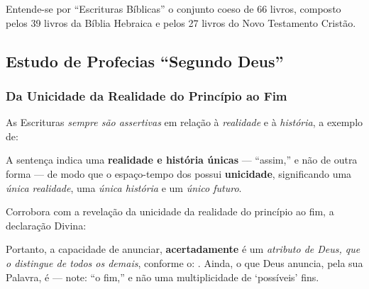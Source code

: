     Entende-se por ``Escrituras Bíblicas'' o conjunto coeso de 66 livros, composto pelos 39 livros da Bíblia Hebraica e pelos 27
    livros do Novo Testamento Cristão.

    \subsection{Estudo de Profecias ``Segundo Deus''}

    \subsubsection{Da Unicidade da Realidade do Princípio ao Fim}

    As Escrituras \emph{sempre são assertivas} em relação à \emph{realidade} e à \emph{história}, a exemplo de:


    A sentença  indica uma \textbf{realidade e história únicas} --- ``assim,'' e não de outra forma ---  de
    modo que o espaço-tempo dos  possui \textbf{unicidade}, significando uma  \emph{única  realidade},  uma
    \emph{única história} e um \emph{único futuro}.

    Corrobora com a revelação da unicidade da realidade do princípio ao fim, a declaração Divina:
        

    Portanto, a capacidade de anunciar, \textbf{acertadamente}  é  um  \emph{atributo  de
    Deus, que o distingue de todos os demais}, conforme o: . Ainda, o  que  Deus  anuncia,
    pela sua Palavra, é  --- note: ``o fim,'' e não uma multiplicidade de `possíveis' fins.

